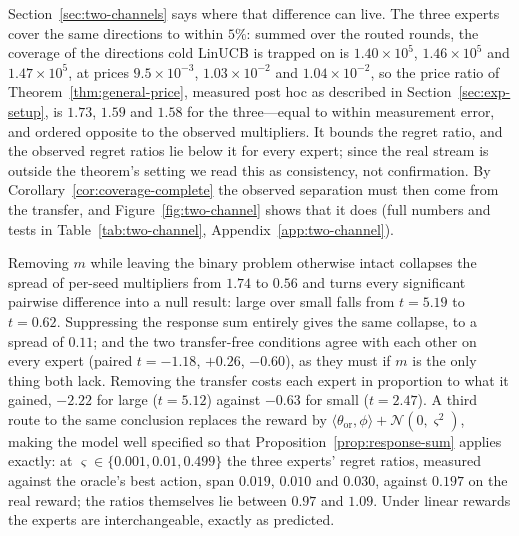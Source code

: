 \documentclass{article}
\theoremstyle{definition}
\theoremstyle{remark}
\theoremstyle{remark}
\begin{document}
Section~\ref{sec:two-channels} says where that difference can live. The three
experts cover the same directions to within $5\%$: summed over the routed
rounds, the coverage of the directions cold LinUCB is trapped on is
$1.40\times10^5$, $1.46\times10^5$ and $1.47\times10^5$, at prices
$9.5\times10^{-3}$, $1.03\times10^{-2}$ and $1.04\times10^{-2}$, so the price
ratio of Theorem~\ref{thm:general-price}, measured post hoc as described in
Section~\ref{sec:exp-setup}, is $1.73$, $1.59$ and $1.58$ for the
three---equal to within measurement error, and ordered opposite to the observed
multipliers. It bounds the regret ratio, and the observed regret ratios lie
below it for every expert; since the real stream is outside the theorem's
setting we read this as consistency, not confirmation. By Corollary~\ref{cor:coverage-complete} the observed
separation must then come from the transfer, and
Figure~\ref{fig:two-channel} shows that it does (full numbers and tests in
Table~\ref{tab:two-channel}, Appendix~\ref{app:two-channel}).

Removing $m$ while leaving the binary problem otherwise intact collapses the
spread of per-seed multipliers from $1.74$ to $0.56$ and turns every
significant pairwise difference into a null result: large over small falls
from $t=5.19$ to $t=0.62$. Suppressing the response sum entirely gives the
same collapse, to a spread of $0.11$; and the two transfer-free conditions
agree with each other on every expert (paired $t=-1.18$, $+0.26$, $-0.60$),
as they must if $m$ is the only thing both lack. Removing the transfer costs
each expert in proportion to what it gained, $-2.22$ for large ($t=5.12$)
against $-0.63$ for small ($t=2.47$). A third route to the same conclusion
replaces the reward by $\langle\theta_{\mathrm{or}},\phi\rangle+\mathcal
N(0,\varsigma^2)$, making the model well specified so that
Proposition~\ref{prop:response-sum} applies exactly: at
$\varsigma\in\{0.001,0.01,0.499\}$ the three experts' regret ratios, measured
against the oracle's best action, span $0.019$, $0.010$ and $0.030$, against
$0.197$ on the real reward; the ratios themselves lie between $0.97$ and
$1.09$. Under linear rewards the experts are interchangeable, exactly as
predicted.
\end{document}
